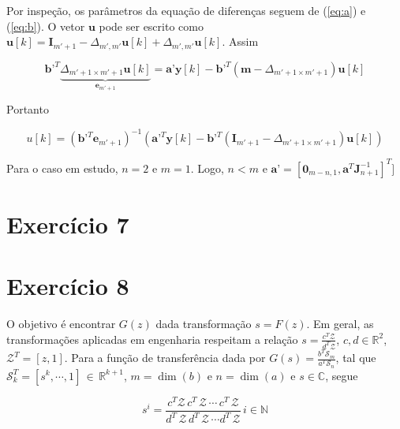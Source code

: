 \documentclass{article}
\begin{document}
Por inspeção, os parâmetros da equação de diferenças seguem de (\ref{eq:a}) e (\ref{eq:b}). O vetor $\textbf{u}$ pode ser escrito como $\textbf{u}[k] = \textbf{I}_{m' + 1} - \Delta_{m', m'} \textbf{u}[k] + \Delta_{m', m'} \textbf{u}[k]$. Assim

\begin{equation}
\textbf{b'}^T \underbrace{\Delta_{m' + 1 \times m' + 1} \textbf{u}[k]}_{\textbf{e}_{m'+1}} = \textbf{a'} \textbf{y}[k] - \textbf{b'}^T (\textbf{m} - \Delta_{m' + 1 \times m' + 1}) \textbf{u}[k]
 \end{equation}

Portanto

\begin{equation}
u[k] = (\textbf{b'}^T \textbf{e}_{m' + 1})^{-1}(\textbf{a'}^T \textbf{y}[k] - \textbf{b'}^T (\textbf{I}_{m' + 1} - \Delta_{m' + 1 \times m' + 1}) \textbf{u}[k])
\end{equation}

Para o caso em estudo, $n = 2$ e $m = 1$. Logo, $n < m$ e $\textbf{a'} = [\textbf{0}_{m-n, 1}, \textbf{a}^T \textbf{J}^{-1}_{n+1}]^T]$

\begin{enumerate}
\end{enumerate}

\section*{Exercício 7}

\section*{Exercício 8}
\label{ex:ex8}

O objetivo é encontrar $G(z)$ dada transformação $s = F(z)$. Em geral, as transformações aplicadas em engenharia respeitam a relação $s = \frac{c^T \mathcal{Z}}{d^T \mathcal{Z}}$, $c, d \in \mathbb{R}^2$, $\mathcal{Z}^T = [z, 1] $. Para a função de transferência dada por $G(s) = \frac{b^T \mathcal{S}_m}{a^T \mathcal{S}_n}$, tal que $\mathcal{S}_k^T = [s^k, \cdots, 1]  \, \in \, \mathbb{R}^{k+1}$, $m = \dim(b)$ e $n = \dim(a)$ e $s \in \mathbb{C}$, segue

\begin{equation}
s^i = \frac{c^T \mathcal{Z} \, c^T \, \mathcal{Z} \, \cdots \, c^T \, \mathcal{Z}}{d^T \, \mathcal{Z} \, d^T \, \mathcal{Z} \, \cdots d^T \, \mathcal{Z}} \, i \in \mathbb{N}
\label{eq:sexpi}
\end{equation}
\end{document}
